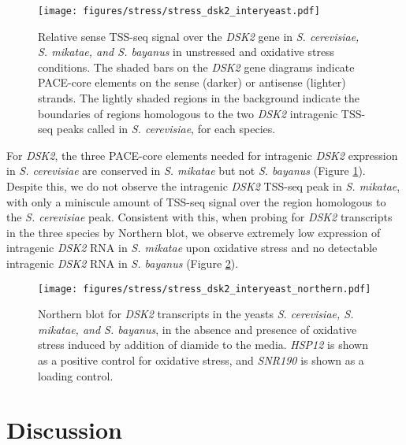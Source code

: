 \begin{figure}[h]
    \texttt{[image: figures/stress/stress\_dsk2\_interyeast.pdf]}
    \caption[Sense TSS-seq signal over the \textit{DSK2} gene in \textit{S. cerevisiae, S. mikatae, and S. bayanus} in unstressed and oxidative stress conditions.]{Relative sense TSS-seq signal over the \textit{DSK2} gene in \textit{S. cerevisiae, S. mikatae, and S. bayanus} in unstressed and oxidative stress conditions. The shaded bars on the \textit{DSK2} gene diagrams indicate PACE-core elements on the sense (darker) or antisense (lighter) strands. The lightly shaded regions in the background indicate the boundaries of regions homologous to the two \textit{DSK2} intragenic TSS-seq peaks called in \textit{S. cerevisiae}, for each species.}
    \label{fig:stress_dsk2_interyeast}
\end{figure}

For \textit{DSK2}, the three PACE-core elements needed for intragenic \textit{DSK2} expression in \textit{S. cerevisiae} are conserved in \textit{S. mikatae} but not \textit{S. bayanus} (Figure \ref{fig:stress_dsk2_interyeast}).
Despite this, we do not observe the intragenic \textit{DSK2} TSS-seq peak in \textit{S. mikatae}, with only a miniscule amount of TSS-seq signal over the region homologous to the \textit{S. cerevisiae} peak.
Consistent with this, when probing for \textit{DSK2} transcripts in the three species by Northern blot, we observe extremely low expression of intragenic \textit{DSK2} RNA in \textit{S. mikatae} upon oxidative stress and no detectable intragenic \textit{DSK2} RNA in \textit{S. bayanus} (Figure \ref{fig:stress_dsk2_interyeast_northern}).

\begin{figure}[h]
    \centering
    \texttt{[image: figures/stress/stress\_dsk2\_interyeast\_northern.pdf]}
    \caption[Northern blot for \textit{DSK2} transcripts in the yeasts \textit{S. cerevisiae, S. mikatae, and S. bayanus}, in the absence and presence of oxidative stress.]{Northern blot for \textit{DSK2} transcripts in the yeasts \textit{S. cerevisiae, S. mikatae, and S. bayanus}, in the absence and presence of oxidative stress induced by addition of diamide to the media. \textit{HSP12} is shown as a positive control for oxidative stress, and \textit{SNR190} is shown as a loading control.}
    \label{fig:stress_dsk2_interyeast_northern}
\end{figure}

\section{Discussion}

